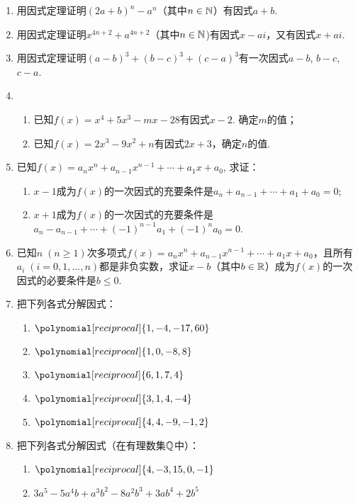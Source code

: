 \begin{enumerate}
\item 用因式定理证明$(2a+b)^n-a^n$（其中$n\in\mathbb{N}$）有因式$a+b$.
\item 用因式定理证明$x^{4n+2}+a^{4n+2}$（其中$n\in\mathbb{N}$)有因式$x-ai$，又有因式$x+ai$.
\item 用因式定理证明$(a-b)^3+(b-c)^3+(c-a)^3$有一次因式$a-b$, $b-c$, $c-a$.
\item \begin{enumerate}[(1)]
\item 已知$f(x)=x^4+5x^3-mx-28$有因式$x-2$. 确定$m$的值；
\item 已知$f(x)=2x^3-9x^2+n$有因式$2x+3$，确定$n$的值.    
\end{enumerate}
\item 已知$f(x)=a_nx^n+a_{n-1}x^{n-1}+\cdots+a_1x+a_0$, 求证：
\begin{enumerate}[(1)]
    \item $x-1$成为$f(x)$的一次因式的充要条件是$a_n+a_{n-1}+\cdots +a_1+a_0=0$;
    \item $x+1$成为$f(x)$的一次因式的充要条件是$a_n-a_{n-1}+\cdots +(-1)^{n-1}a_1+(-1)^n a_0=0$.
\end{enumerate}

\item 已知$n\; (n\ge 1)$次多项式$f(x)=a_nx^n+a_{n-1}x^{n-1}+\cdots+a_1x+a_0$，且所有$a_i\; (i=0,1,\ldots,n)$都是非负实数，求证$x-b$（其中$b\in\mathbb{R}$）成为$f(x)$的一次因式的必要条件是$b\le 0$.
\item 把下列各式分解因式：
\begin{multicols}{2}
\begin{enumerate}[(1)]
    \item $\polynomial[reciprocal]{1,-4,-17,60}$
    \item $\polynomial[reciprocal]{1,0,-8,8}$
    \item $\polynomial[reciprocal]{6,1,7,4}$
    \item $\polynomial[reciprocal]{3,1,4,-4}$
    \item $\polynomial[reciprocal]{4,4,-9,-1,2}$
\end{enumerate}
\end{multicols}

\item 把下列各式分解因式（在有理数集$\mathbb{Q}$中）：
\begin{enumerate}[(1)]
    \item $\polynomial[reciprocal]{4,-3,15,0,-1}$
    \item $3a^5-5a^4b+a^3b^2-8a^2b^3+3ab^4+2b^5$
\end{enumerate}
\end{enumerate}

